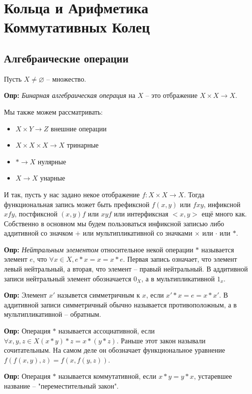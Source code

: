 \chapter{Кольца и Арифметика Коммутативных Колец}
\section{Алгебраические операции}
Пусть $X\neq\varnothing$ – множество.

\textbf{Опр:} \emph{Бинарная алгебраическая операция} на $X$ – это отбражение
$X\times X\longrightarrow X$.

Мы также можем рассматривать:
\begin{itemize}
    \item $X\times Y\longrightarrow Z$ внешние операции
    \item $X\times X\times X\longrightarrow X$ тринарные
    \item ${*}\longrightarrow X$ нулярные
    \item $X\longrightarrow X$ унарные
\end{itemize}

И так, пусть у нас задано некое отображение $f: X\times X\longrightarrow X$.
Тогда функциональная запись может быть префиксной $f(x,y)$ или $fxy$, инфиксной
$xfy$, постфиксной $(x,y)f$ или $xyf$ или интерфиксная $<x,y>$ ещё много как.
Собственно в основном мы будем пользоваться инфиксной записью либо аддитивной
со значком $+$ или мультипликативной со значками $\times$ или $\cdot$ или $*$.

\textbf{Опр:} \emph{Нейтральным элементом} относительное некой операции $*$
называется элемент $e$, что $\forall x\in X, e*x = x = x*e$. Первая запись
означает, что элемент левый нейтральный, а вторая, что элемент – правый
нейтральный. В аддитивной записи нейтральный элемент обозначается $0_X$, а в
мультипликативной $1_x$.

\textbf{Опр:} Элемент $x'$ назывется симметричным к $x$, если $x'*x=e=x*x'$.
В аддитивной записи симметричный обычно называется противоположным, а в
мультипликативной – обратным.

\textbf{Опр:} Операция $*$ называется ассоциативной, если $\forall x, y, z \in
X (x*y)*z = x*(y*z)$. Раньше этот закон называли сочитательным. На самом деле
он обозначает функциональное уравнение $f(f(x,y),z) = f(x,f(y,z))$.

\textbf{Опр:} Операция $*$ называется коммутативной, если $x*y=y*x$, устаревшее
название – "переместительный закон".

